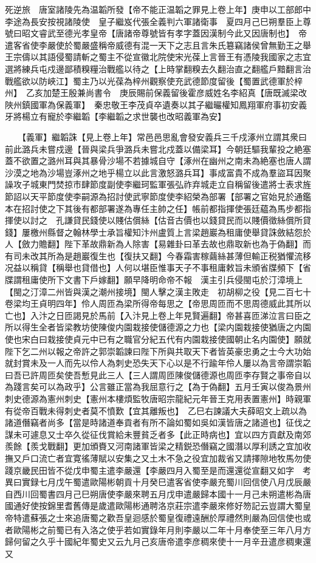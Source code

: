 死逆旅　唐室諸陵先為温韜所發【帝不能正温韜之罪見上卷上年】庚申以工部郎中李途為長安按視諸陵使　皇子繼岌代張全義判六軍諸衛事　夏四月己巳朔羣臣上尊號曰昭文睿武至德光孝皇帝【唐諸帝尊號皆有孝字蓋因漢制今此又因唐制也】　帝遣客省使李嚴使於蜀嚴盛稱帝威德有混一天下之志且言朱氏簒竊諸侯曾無勤王之舉王宗儔以其語侵蜀請斬之蜀主不從宣徽北院使宋光葆上言晉王有憑陵我國家之志宜選將練兵屯戍邊鄙積糗糧治戰艦以待之【上時掌翻糗去久翻治直之翻艦戶黯翻言治戰艦欲以防峽江】蜀主乃以光葆為梓州觀察使充武德節度留後【蜀置武德軍於梓州】　乙亥加楚王殷兼尚書令　庚辰賜前保義留後霍彦威姓名李紹真【唐既滅梁改陜州鎮國軍為保義軍】　秦忠敬王李茂貞卒遺奏以其子繼曮權知鳳翔軍府事初安義牙將楊立有寵於李繼韜【李繼韜之求世襲也改昭義軍為安】

　　【義軍】繼韜誅【見上卷上年】常邑邑思亂會發安義兵三千戍涿州立謂其衆曰前此潞兵未嘗戍邊【晉與梁兵爭潞兵未嘗北戍蓋以備梁耳】今朝廷驅我輩投之絶塞蓋不欲置之潞州耳與其暴骨沙場不若據城自守【涿州在幽州之南未為絶塞也唐人謂沙漠之地為沙場豈涿州之地乎楊立以此言激怒潞兵耳】事成富貴不成為羣盜耳因聚譟攻子城東門焚掠市肆節度副使李繼珂監軍張弘祚弃城走立自稱留後遣將士表求旌節詔以天平節度使李嗣源為招討使武寧節度使李紹榮為部署【部署之官始見於通鑑本在招討使之下其後有都部署遂為專任主帥之任】帳前都指揮使張廷藴為馬步都指揮使以討之　孔謙貸民錢使以賤估償絲【估音古價也以錢貸民而以賤價徵絲償所貸錢】屢檄州縣督之翰林學士承旨權知汴州盧質上言梁趙巖為租庸使舉貸誅斂結怨於人【斂力贍翻】陛下革故鼎新為人除害【易雜卦曰革去故也鼎取新也為于偽翻】而有司未改其所為是趙巖復生也【復扶又翻】今春霜害稼繭絲甚薄但輸正税猶懼流移况益以稱貸【稱舉也貸借也】人何以堪臣惟事天子不事租庸敕旨未頒省牒頻下【省牒謂租庸使所下文書下戶嫁翻】願早降明命帝不報　漢主引兵侵閩屯於汀漳境上【閩之汀漳二州皆與漢之潮州接境】閩人擊之漢主敗走　初胡柳之役【見二百七十卷梁均王貞明四年】伶人周匝為梁所得帝每思之【帝思周匝而不思周德威此其所以亡也】入汴之日匝謁見於馬前【入汴見上卷上年見賢遍翻】帝甚喜匝涕泣言曰臣之所以得生全者皆梁教坊使陳俊内園栽接使儲德源之力也【梁内園栽接使猶唐之内園使也宋白曰栽接使貞元中已有之職官分紀五代有内園栽接使國朝止名内園使】願就陛下乞二州以報之帝許之郭崇韜諫曰陛下所與共取天下者皆英豪忠勇之士今大功始就封賞未及一人而先以伶人為刺史恐失天下心以是不行踰年伶人屢以為言帝謂崇韜曰吾已許周匝矣使吾慙見此三人【三人謂周匝陳俊儲德源也周匝李存賢之事帝自以為踐言矣可以為政乎】公言雖正當為我屈意行之【為于偽翻】五月壬寅以俊為景州刺史德源為憲州刺史【憲州本樓煩監牧唐昭宗龍紀元年晉王克用表置憲州】時親軍有從帝百戰未得刺史者莫不憤歎【宜其離叛也】　乙巳右諫議大夫薛昭文上疏以為諸道僭竊者尚多【當是時諸道奉貢者有所不論如蜀如吳如漢皆唐之諸道也】征伐之謀未可遽息又士卒久從征伐賞給未豐貧乏者多【此正時病也】宜以四方貢獻及南郊羨餘【羨戈戰翻】更加頒賚又河南諸軍皆梁之精鋭恐僭竊之國潛以厚利誘之宜加收撫又戶口流亡者宜寛徭薄賦以安集之又土木不急之役宜加裁省又請擇隙地牧馬勿使踐京畿民田皆不從戊申蜀主遣李嚴還【李嚴四月入蜀至是而還還從宣翻又如字　考異曰實録七月戊午蜀遣歐陽彬朝貢十月癸巳遣客省使李嚴充蜀川回信使八月戊辰嚴自西川回蜀書四月己巳朔唐使李嚴來聘五月戊申遣嚴歸本國十一月己未朔遣彬為唐國通好使按錦里耆舊傳是歲遣歐陽彬通聘洛京莊宗遣李嚴來修好笏記云豈謂大蜀皇帝特遣蘇張之士來追唐蜀之歡吾皇迴感於蜀皇復禮遠酬於厚禮然則嚴為回信使也或者歐陽彬之前蜀已有入洛之使乎若如實錄年月則李嚴以二年十月奉使至三年八月方歸何留之久乎十國紀年蜀史又云九月己亥唐帝遣李彦稠來使十一月辛丑遣彦稠東還又